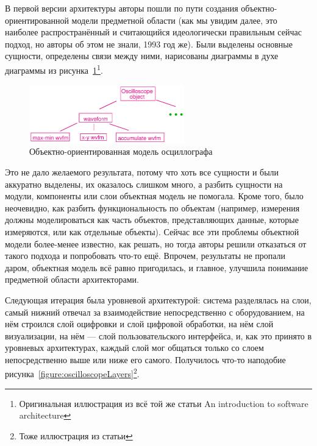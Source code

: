\documentclass[a5paper]{article}
\begin{document}
В первой версии архитектуры авторы пошли по пути создания объектно-ориентированной модели предметной области (как мы увидим далее, это наиболее распространённый и считающийся идеологически правильным сейчас подход, но авторы об этом не знали, 1993 год же). Были выделены основные сущности, определены связи между ними, нарисованы диаграммы в духе диаграммы из рисунка~\ref{figure:oscilloscopeObjects}\footnote{Оригинальная иллюстрация из всё той же статьи An introduction to software architecture}.

\begin{figure}
    \begin{center}
        \includegraphics[width=0.6\textwidth]{oscilloscopeObjects.png}
    \end{center}
    \caption{Объектно-ориентированная модель осциллографа}
    \label{figure:oscilloscopeObjects}
\end{figure}

Это не дало желаемого результата, потому что хоть все сущности и были аккуратно выделены, их оказалось слишком много, а  разбить сущности на модули, компоненты или слои объектная модель не помогала. Кроме того, было неочевидно, как разбить функциональность по объектам (например, измерения должны моделироваться как часть объектов, представляющих данные, которые измеряются, или как отдельные объекты). Сейчас все эти проблемы объектной модели более-менее известно, как решать, но тогда авторы решили отказаться от такого подхода и попробовать что-то ещё. Впрочем, результаты не пропали даром, объектная модель всё равно пригодилась, и главное, улучшила понимание предметной области архитекторами.

Следующая итерация была уровневой архитектурой: система разделялась на слои, самый нижний отвечал за взаимодействие непосредственно с оборудованием, на нём строился слой оцифровки и слой цифровой обработки, на нём слой визуализации, на нём --- слой пользовательского интерфейса, и, как это принято в уровневых архитектурах, каждый слой мог общаться только со слоем непосредственно выше или ниже его самого. Получилось что-то наподобие рисунка~\ref{figure:oscilloscopeLayers}\footnote{Тоже иллюстрация из статьи}.
\end{document}
